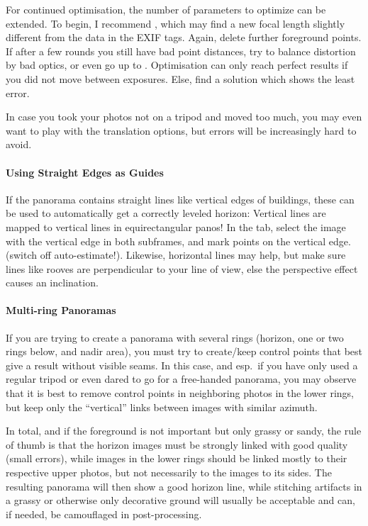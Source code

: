 For continued optimisation, the number of parameters to optimize can
be extended. To begin, I recommend , which may find a new focal length slightly different from
the data in the EXIF tags. Again, delete further foreground points. If
after a few rounds you still have bad point distances, try
 to balance
distortion by bad optics, or even go up to .  Optimisation can only reach perfect results if you
did not move between exposures. Else, find a solution which shows the
least error.

In case you took your photos not on a tripod and moved too much, you
may even want to play with the translation options, but errors will be
increasingly hard to avoid.

\paragraph{Using Straight Edges as Guides}
If the panorama contains straight lines like vertical edges of
buildings, these can be used to automatically get a correctly leveled
horizon: Vertical lines are mapped to vertical lines in
equirectangular panos! In the  tab, select the image
with the vertical edge in both subframes, and mark points on the
vertical edge. (switch off auto-estimate!).
Likewise, horizontal lines may help, but make sure lines like rooves
are perpendicular to your line of view, else the perspective effect
causes an inclination.

\paragraph{Multi-ring Panoramas}
If you are trying to create a panorama with several rings (horizon,
one or two rings below, and nadir area), you must try to create/keep control
points that best give a result without visible seams. In this case,
and esp.\ if you have only used a regular tripod or even dared to go
for a free-handed panorama, you may observe that it is best to remove
control points in neighboring photos in the lower rings, but keep only
the ``vertical'' links between images with similar azimuth.

In total, and if the foreground is not important but only grassy or
sandy, the rule of thumb is that the horizon images must be strongly
linked with good quality (small errors), while images in the lower
rings should be linked mostly to their respective upper photos, but
not necessarily to the  images to its sides. The resulting panorama will then
show a good horizon line, while stitching artifacts in a grassy or
otherwise only decorative ground will usually be acceptable and can,
if needed, be camouflaged in post-processing.

